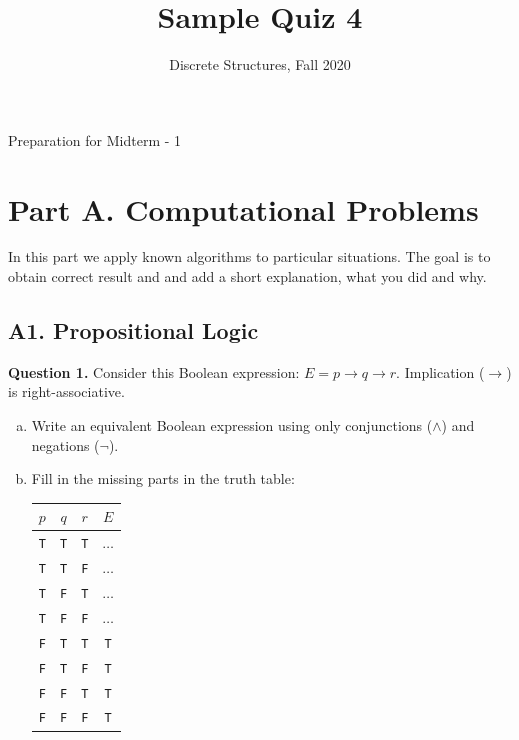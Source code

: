 \documentclass[jou]{apa6}
\title{Sample Quiz 4}
\author{Discrete Structures, Fall 2020}
\affiliation{RBS}
\begin{document}
\thispagestyle{empty}

\twocolumn
{\Large Preparation for Midterm - 1}




\section{Part A. Computational Problems}

In this part we apply known algorithms to particular situations. 
The goal is to obtain correct result and and add a short explanation, what 
you did and why.

\subsection{A1. Propositional Logic}

{\bf Question 1.} 
Consider this Boolean expression: $E = p \rightarrow q \rightarrow r$. 
Implication ($\rightarrow$) is right-associative. 
\begin{enumerate}[(a)]
\item Write an equivalent Boolean expression using only conjunctions ($\wedge$) and negations ($\neg$). 
\item Fill in the missing parts in the truth table:\\
\begin{tabular}{ c | c | c | c }
$p$ & $q$ & $r$ & $E$ \\ \hline
{\tt T} & {\tt T} & {\tt T} & $\ldots$ \\ \hline
{\tt T} & {\tt T} & {\tt F} & $\ldots$ \\ \hline
{\tt T} & {\tt F} & {\tt T} & $\ldots$ \\ \hline
{\tt T} & {\tt F} & {\tt F} & $\ldots$ \\ \hline
{\tt F} & {\tt T} & {\tt T} & {\tt T} \\ \hline
{\tt F} & {\tt T} & {\tt F} & {\tt T} \\ \hline
{\tt F} & {\tt F} & {\tt T} & {\tt T} \\ \hline
{\tt F} & {\tt F} & {\tt F} & {\tt T} \\ \hline
\end{tabular}
\end{enumerate}
\end{document}
